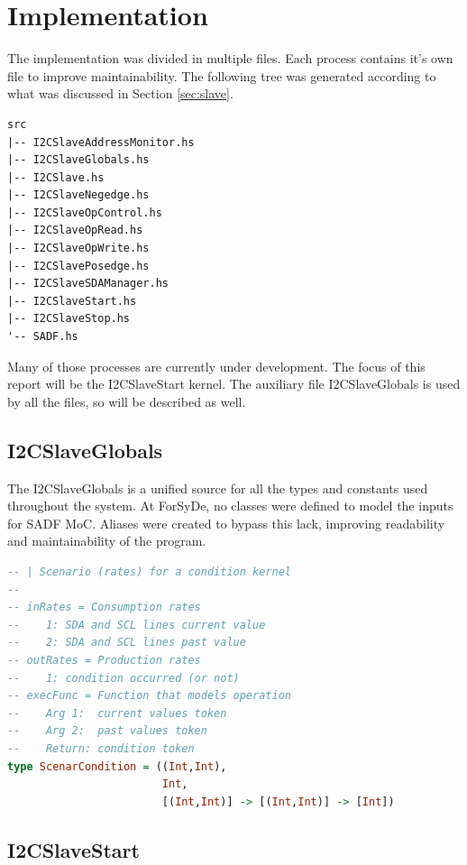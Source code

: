 \documentclass{article}
\begin{document}

\section{Implementation} \label{sec:imple}
The implementation was divided in multiple files. Each process contains it's own file to improve maintainability. The following tree was generated according to what was discussed in Section \ref{sec:slave}.
\begin{lstlisting}[frame=single, basicstyle=\small, caption={Files of implementation}, captionpos=b]
src
|-- I2CSlaveAddressMonitor.hs
|-- I2CSlaveGlobals.hs
|-- I2CSlave.hs
|-- I2CSlaveNegedge.hs
|-- I2CSlaveOpControl.hs
|-- I2CSlaveOpRead.hs
|-- I2CSlaveOpWrite.hs
|-- I2CSlavePosedge.hs
|-- I2CSlaveSDAManager.hs
|-- I2CSlaveStart.hs
|-- I2CSlaveStop.hs
'-- SADF.hs
\end{lstlisting}
Many of those processes are currently under development. The focus of this report will be the I2CSlaveStart kernel. The auxiliary file I2CSlaveGlobals is used by all the files, so will be described as well.

\subsection{I2CSlaveGlobals}

The I2CSlaveGlobals is a unified source for all the types and constants used throughout the system. At ForSyDe, no classes were defined to model the inputs for SADF MoC. Aliases were created to bypass this lack, improving readability and maintainability of the program.
\begin{lstlisting}[frame=single, basicstyle=\small, language={Haskell}, caption={Alias for the Condition's scenario type}, captionpos=b]
-- | Scenario (rates) for a condition kernel
--
-- inRates = Consumption rates
--    1: SDA and SCL lines current value
--    2: SDA and SCL lines past value
-- outRates = Production rates
--    1: condition occurred (or not)
-- execFunc = Function that models operation
--    Arg 1:  current values token
--    Arg 2:  past values token
--    Return: condition token
type ScenarCondition = ((Int,Int),
                        Int,
                        [(Int,Int)] -> [(Int,Int)] -> [Int])
\end{lstlisting}

\subsection{I2CSlaveStart}
\end{document}
